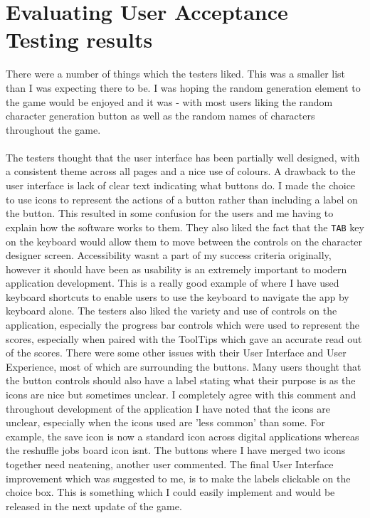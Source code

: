 \section{Evaluating User Acceptance Testing results}
There were a number of things which the testers liked. This was a smaller list than I was expecting there to be. I was hoping the random generation element to the game would be enjoyed and it was - with most users liking the random character generation button as well as the random names of characters throughout the game. \\ \\
The testers thought that the user interface has been partially well designed, with a consistent theme across all pages and a nice use of colours. A drawback to the user interface is lack of clear text indicating what buttons do. I made the choice to use icons to represent the actions of a button rather than including a label on the button. This resulted in some confusion for the users and me having to explain how the software works to them. They also liked the fact that the \verb|TAB| key on the keyboard would allow them to move between the controls on the character designer screen. Accessibility wasn\textquotesingle t a part of my success criteria originally, however it should have been as usability is an extremely important to modern application development. This is a really good example of where I have used keyboard shortcuts to enable users to use the keyboard to navigate the app by keyboard alone. The testers also liked the variety and use of controls on the application, especially the progress bar controls which were used to represent the scores, especially when paired with the ToolTips which gave an accurate read out of the scores. There were some other issues with their User Interface and User Experience, most of which are surrounding the buttons. Many users thought that the button controls should also have a label stating what their purpose is as the icons are nice but sometimes unclear. I completely agree with this comment and throughout development of the application I have noted that the icons are unclear, especially when the icons used are 'less common' than some. For example, the save icon is now a standard icon across digital applications whereas the reshuffle jobs board icon isn\textquotesingle t. The buttons where I have merged two icons together need neatening, another user commented. The final User Interface improvement which was suggested to me, is to make the labels clickable on the choice box. This is something which I could easily implement and would be released in the next update of the game. \\ \\
